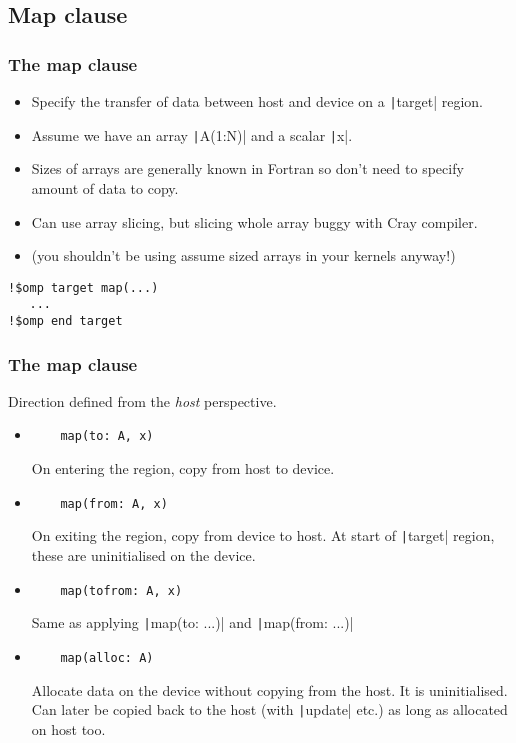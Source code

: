 \documentclass{beamer}
\begin{document}
\subsection{Map clause}
\begin{frame}[fragile]
\frametitle{The map clause}
\begin{itemize}
  \item Specify the transfer of data between host and device on a \texttt|target| region.

\vfill

  \item Assume we have an array \texttt|A(1:N)| and a scalar \texttt|x|.
  \item Sizes of arrays are generally known in Fortran so don't need to specify amount of data to copy.
  \item Can use array slicing, but slicing whole array buggy with Cray compiler.
  \item (you shouldn't be using assume sized arrays in your kernels anyway!)
\end{itemize}

\begin{verbatim}
!$omp target map(...)
   ...
!$omp end target
\end{verbatim}

\end{frame}

\begin{frame}[fragile]
\frametitle{The map clause}
Direction defined from the \emph{host} perspective.
\begin{itemize}
  \item
    \begin{verbatim}
    map(to: A, x)
    \end{verbatim}
    On entering the region, copy from host to device.

  \item
    \begin{verbatim}
    map(from: A, x)
    \end{verbatim}
    On exiting the region, copy from device to host. At start of \texttt|target| region, these are uninitialised on the device.

  \item
    \begin{verbatim}
    map(tofrom: A, x)
    \end{verbatim}
    Same as applying \texttt|map(to: ...)| and \texttt|map(from: ...)|

  \item
    \begin{verbatim}
    map(alloc: A)
    \end{verbatim}
    Allocate data on the device without copying from the host. It is uninitialised.
    Can later be copied back to the host (with \texttt|update| etc.) as long as allocated on host too.
\end{itemize}
\end{frame}
\end{document}
